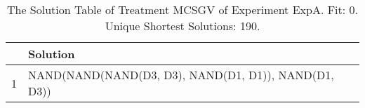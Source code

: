 \begin{table}[ht]
\centering
\begin{tabular}{rp{9cm}}
  \hline
 & Solution \\ 
  \hline
1 & NAND(NAND(NAND(D3, D3), NAND(D1, D1)), NAND(D1, D3)) \\ 
   \hline
\end{tabular}
\caption{The Solution Table of Treatment MCSGV of Experiment ExpA. Fit: 0. Unique Shortest Solutions: 190.} 
\end{table}
